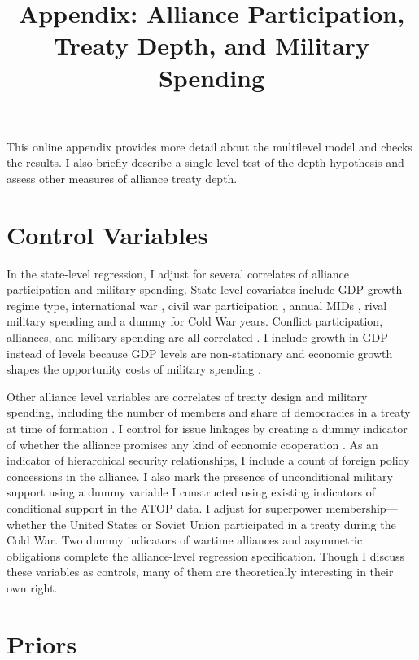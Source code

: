 \documentclass[12pt]{article}
\title{\textbf{Appendix: Alliance Participation, Treaty Depth, and Military Spending}}
\date{}
\begin{document}
\maketitle 

\doublespace 

This online appendix provides more detail about the multilevel model and checks the results. I also briefly describe a single-level test of the depth hypothesis and assess other measures of alliance treaty depth. 


\section{Control Variables} 


In the state-level regression, I adjust for several correlates of alliance participation and military spending. 
State-level covariates include GDP growth \citep{Boltetal2018} regime type, international war \citep{Reiteretal2016}, civil war participation \citep{SarkeesWayman2010}, annual MIDs \citep{Gibleretal2016}, rival military spending \citep{ThompsonDreyer2012} and a dummy for Cold War years.
Conflict participation, alliances, and military spending are all correlated \citep{SeneseVasquez2008}.
I include growth in GDP instead of levels because GDP levels are non-stationary and economic growth shapes the opportunity costs of military spending \citep{Kimball2010, Zielinskietal2017}.  

 
Other alliance level variables are correlates of treaty design and military spending, including the number of members and share of democracies in a treaty at time of formation \citep{Chibaetal2015}. 
I control for issue linkages by creating a dummy indicator of whether the alliance promises any kind of economic cooperation \citep{Poast2013, LongLeeds2006}. 
As an indicator of hierarchical security relationships, I include a count of foreign policy concessions in the alliance. 
I also mark the presence of unconditional military support using a dummy variable I constructed using existing indicators of conditional support in the ATOP data. 
I adjust for superpower membership--- whether the United States or Soviet Union participated in a treaty during the Cold War. 
Two dummy indicators of wartime alliances and asymmetric obligations \citep{Leedsetal2002} complete the alliance-level regression specification. 
Though I discuss these variables as controls, many of them are theoretically interesting in their own right. 


\section{Priors}
\end{document}
